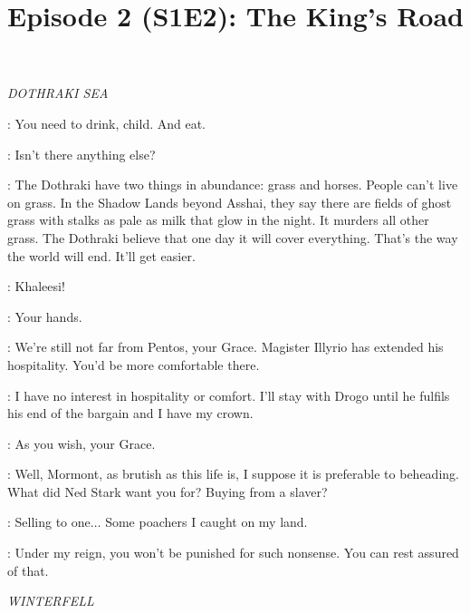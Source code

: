 

\title{Episode 2 (S1E2): The King's Road}
\author{}
\date{}
\maketitle



\scene

\textit{DOTHRAKI SEA}


\JORAH: You need to drink, child. And eat. 

\DAENERYS: Isn't there anything else? 

\JORAH: The Dothraki have two things in abundance: grass and horses. People can't live on grass. In the Shadow Lands beyond Asshai, they say there are fields of ghost grass with stalks as pale as milk that glow in the night. It murders all other grass. The Dothraki believe that one day it will cover everything. That's the way the world will end. It'll get easier. 


\DOREAH: Khaleesi! 

\IRRI: Your hands. 

\JORAH: We're still not far from Pentos, your Grace. Magister Illyrio has extended his hospitality. You'd be more comfortable there. 

\VISERYS: I have no interest in hospitality or comfort. I'll stay with Drogo until he fulfils his end of the bargain and I have my crown. 

\JORAH: As you wish, your Grace. 

\VISERYS: Well, Mormont, as brutish as this life is, I suppose it is preferable to beheading. What did Ned Stark want you for? Buying from a slaver? 

\JORAH: Selling to one$\ldots$ Some poachers I caught on my land. 

\VISERYS: Under my reign, you won't be punished for such nonsense. You can rest assured of that. 

\scene

\textit{WINTERFELL}


